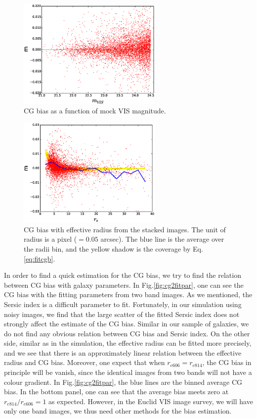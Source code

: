 \documentclass[useAMS,usenatbib]{mn2e}
\begin{document}
%
\begin{figure}
\includegraphics[width=7.0cm]{zcgb-magt17.eps}
\caption{CG bias as a function of mock VIS magnitude. }
\label{fig:cg2magvis}
\end{figure}
%
\begin{figure}
\includegraphics[width=7.0cm]{zcgb-ret17.eps}
\caption{CG bias with effective radius from the stacked images. The
  unit of radius is a pixel ($=0.05$ arcsec). The blue line is the
  average over the radii bin, and the yellow shadow is the coverage
  by Eq.\ref{eq:fitcgb}.}
\label{fig:cg2re}
\end{figure}
%
In order to find a quick estimation for the CG bias, we try to find
the relation between CG bias with galaxy parameters. In
Fig.\ref{fig:cg2fitpar}, one can see the CG bias with the fitting
parameters from two band images. As we mentioned, the Sersic index is
a difficult parameter to fit. Fortunately, in our simulation using
noisy images, we find that the large scatter of the fitted Sersic
index does not strongly affect the estimate of the CG bias. Similar in
our sample of galaxies, we do not find any obvious relation between CG
bias and Sersic index. On the other side, similar as in the
simulation, the effective radius can be fitted more precisely, and we
see that there is an approximately linear relation between the effective
radius and CG bias.  Moreover, one expect that when
$r_{e606}=r_{e814}$, the CG bias in principle will be vanish, since
the identical images from two bands will not have a colour gradient. In
Fig.\ref{fig:cg2fitpar}, the blue lines are the binned average CG
bias. In the bottom panel, one can see that the average bias meets
zero at $r_{e814}/r_{e606}=1$ as expected. However, in the Euclid VIS
image survey, we will have only one band images, we thus need other
methods for the bias estimation.
\end{document}
